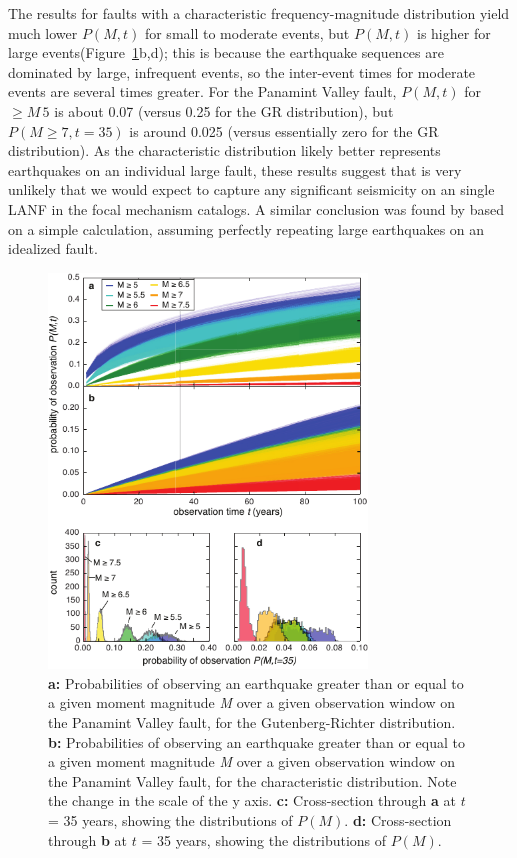 \documentclass[twocolumn,grl]{AGUTeX}
\begin{document}
\begin{article}
The results for faults with a characteristic frequency-magnitude distribution
yield much lower $P(M,t)$ for small to moderate events, but $P(M,t)$ is higher for large events(Figure~\ref{fig:pv}b,d); this is because the earthquake
sequences are dominated by large, infrequent events, so the inter-event times
for moderate events are several times greater. For the Panamint Valley fault,
$P(M,t)$ for $ \ge M \, 5$ is about 0.07 (versus 0.25 for the GR distribution),
but $P(M\ge 7, t=35)$ is around 0.025 (versus essentially zero for the GR
distribution).  As the characteristic distribution likely better represents
earthquakes on an individual large fault, these results suggest that is 
very unlikely that we would expect to capture any significant seismicity
on an single LANF in the focal mechanism catalogs. A similar conclusion was 
found by \citet{wernicke1995seis} based on a simple calculation, 
assuming perfectly repeating large earthquakes on an idealized fault. 
 
\begin{figure}[th]
 \noindent\includegraphics[width=20pc]{./figures/pv_probs.pdf}
 \caption{\textbf{a:} Probabilities of observing an earthquake greater than or
 equal to a given moment magnitude \emph{M} over a given observation window 
 on the Panamint Valley fault, for the Gutenberg-Richter distribution. 
 \textbf{b:} Probabilities of observing an earthquake greater than or equal to
 a given moment magnitude \emph{M} over a given observation window on the
 Panamint Valley fault, for the characteristic distribution.  Note the change
 in the scale of the y axis.
 \textbf{c:} Cross-section through \textbf{a} at $t$ = 35 years, showing the
 distributions of $P(M)$.
\textbf{d:} Cross-section through \textbf{b} at $t$ = 35 years, showing the
 distributions of $P(M)$.}
 \label{fig:pv}
\end{figure}


\end{article}
\end{document}
